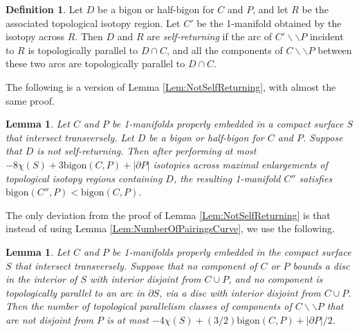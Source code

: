\documentclass[oneside]{amsart}
\numberwithin{equation}{section}
\theoremstyle{plain}
\newtheorem{lemma}[equation]{Lemma}
\theoremstyle{definition}
\newtheorem{definition}[equation]{Definition}
\newcommand{\cut}{\backslash\backslash}
\begin{document}
\begin{definition}
\label{Def:SelfReturningBigon}
Let $D$ be a bigon or half-bigon for $C$ and $P$, and let $R$ be the associated topological isotopy region. Let $C'$ be the 1-manifold obtained by the isotopy across $R$. Then $D$ and $R$ are \emph{self-returning} if the arc of $C' \cut P$ incident to $R$ is topologically parallel to $D \cap C$, and all the components of $C \cut P$ between these two arcs are topologically parallel to $D \cap C$.
\end{definition}


The following is a version of Lemma \ref{Lem:NotSelfReturning}, with almost the same proof.

\begin{lemma}
\label{Lem:NotSelfReturningBigon}
Let $C$ and $P$ be 1-manifolds properly embedded in a compact surface $S$ that intersect transversely. Let $D$ be a bigon or half-bigon for $C$ and $P$. Suppose that $D$ is not self-returning. Then after performing at most $-8 \chi(S) + 3 \mathrm{bigon}(C,P) + |\partial P|$ isotopies across maximal enlargements of topological isotopy regions containing $D$, the resulting 1-manifold $C''$ satisfies $\mathrm{bigon}(C'',P) < \mathrm{bigon}(C,P)$.
\end{lemma}

The only deviation from the proof of Lemma \ref{Lem:NotSelfReturning} is that instead of using Lemma \ref{Lem:NumberOfPairingsCurve}, we use the following.

\begin{lemma}
\label{Lem:NumberNonParallelRegions}
Let $C$ and $P$ be 1-manifolds properly embedded in the compact surface $S$ that intersect transversely. Suppose that no component of $C$ or $P$ bounds a disc in the interior of $S$ with interior disjoint from $C \cup P$, and no component is topologically parallel to an arc in $\partial S$, via a disc with interior disjoint from $C \cup P$. 
Then the number of topological parallelism classes of components of $C \cut P$ that are not disjoint from $P$ is at most $-4\chi(S) + (3/2) \mathrm{bigon}(C,P) + |\partial P|/2$.
\end{lemma}
\end{document}
